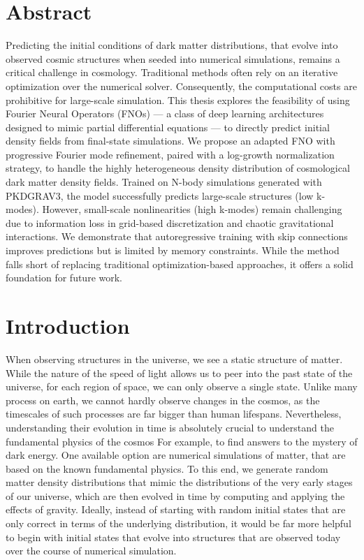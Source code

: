 \documentclass{article}
\begin{document}
\section*{Abstract}

Predicting the initial conditions of dark matter distributions, that evolve into observed cosmic structures when seeded into numerical simulations, remains a critical challenge in cosmology. Traditional methods often rely on an iterative optimization over the numerical solver. Consequently, the computational costs are prohibitive for large-scale simulation. This thesis explores the feasibility of using Fourier Neural Operators (FNOs) — a class of deep learning architectures designed to mimic partial differential equations — to directly predict initial density fields from final-state simulations. We propose an adapted FNO with progressive Fourier mode refinement, paired with a log-growth normalization strategy, to handle the highly heterogeneous density distribution of cosmological dark matter density fields. Trained on N-body simulations generated with PKDGRAV3, the model successfully predicts large-scale structures (low k-modes). However, small-scale nonlinearities (high k-modes) remain challenging due to information loss in grid-based discretization and chaotic gravitational interactions. We demonstrate that autoregressive training with skip connections improves predictions but is limited by memory constraints. While the method falls short of replacing traditional optimization-based approaches, it offers a solid foundation for future work. 

\newpage 

\tableofcontents

\newpage


\section{Introduction}


When observing structures in the universe, we see a static structure of matter. While the nature of the speed of light allows us to peer into the past state of the universe, for each region of space, we can only observe a single state. Unlike many process on earth, we cannot hardly observe changes in the cosmos, as the timescales of such processes are far bigger than human lifespans. Nevertheless, understanding their evolution in time is absolutely crucial to understand the fundamental physics of the cosmos For example, to find answers to the mystery of dark energy. One available option are numerical simulations of matter, that are based on the known fundamental physics. To this end, we generate random matter density distributions that mimic the distributions of the very early stages of our universe, which are then evolved in time by computing and applying the effects of gravity. Ideally, instead of starting with random initial states that are only correct in terms of the underlying distribution, it would be far more helpful to begin with initial states that evolve into structures that are observed today over the course of numerical simulation. 
\end{document}
